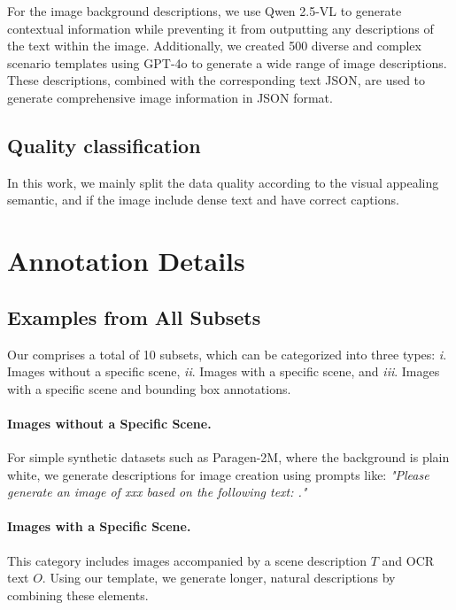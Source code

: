 For the image background descriptions, we use Qwen 2.5-VL to generate contextual information while preventing it from outputting any descriptions of the text within the image. Additionally, we created 500 diverse and complex scenario templates using GPT-4o to generate a wide range of image descriptions. These descriptions, combined with the corresponding text JSON, are used to generate comprehensive image information in JSON format.


\subsection{Quality classification}
In this work, we mainly split the data quality according to the visual appealing semantic, and if the image include dense text and have correct captions.



\clearpage

\section{Annotation Details}

\subsection{Examples from All Subsets}

Our \DatasetName comprises a total of 10 subsets, which can be categorized into three types: \emph{i}. Images without a specific scene, \emph{ii}. Images with a specific scene, and \emph{iii}. Images with a specific scene and bounding box annotations.

\paragraph{Images without a Specific Scene.}
For simple synthetic datasets such as Paragen-2M, where the background is plain white, we generate descriptions for image creation using prompts like: \textit{"Please generate an image of xxx based on the following text: ."}

\paragraph{Images with a Specific Scene.}
This category includes images accompanied by a scene description $T$ and OCR text $O$. Using our template, we generate longer, natural descriptions by combining these elements.

